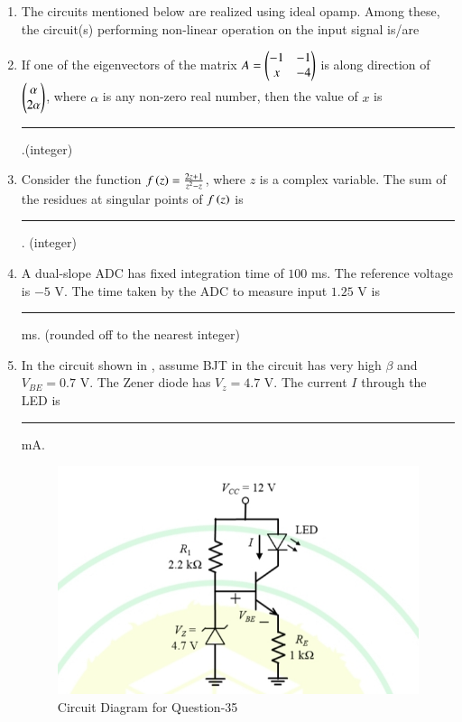 \documentclass[journal,12pt,onecolumn]{IEEEtran}
\theoremstyle{remark}
\begin{document}
\begin{enumerate}
\item The circuits mentioned below are realized using ideal opamp. Among these, the circuit(s) performing non-linear operation on the input signal is/are \par\hfill{}
\begin{enumerate}
\end{enumerate}


\item If one of the eigenvectors of the matrix 
$A=\begin{pmatrix}-1 & -1\\ x & -4\end{pmatrix}$
is along direction of $\begin{pmatrix}\alpha \\ 2\alpha\end{pmatrix}$, where $\alpha$ is any non-zero real number, then the value of $x$ is \rule{1.5cm}{0.4pt}.(integer) \par\hfill{}


\item Consider the function $f\left(z\right)=\frac{2z+1}{z^2-z}$, where $z$ is a complex variable. The sum of the residues at singular points of $f\left(z\right)$ is \rule{1.5cm}{0.4pt}. (integer) \par\hfill{}


\item A dual-slope ADC has fixed integration time of $100$ ms. The reference voltage is $-5$ V. The time taken by the ADC to measure input $1.25$ V is \rule{1.5cm}{0.4pt} ms. (rounded off to the nearest integer) \par\hfill{}
 

\item In the circuit shown in , assume BJT in the circuit has very high $\beta$ and $V_{BE}=0.7$ V. The Zener diode has $V_z=4.7$ V. The current $I$ through the LED is \rule{1.5cm}{0.4pt} mA. \par\hfill{}
\begin{figure}[H]
\centering
\includegraphics[width=0.5\columnwidth]{Figs/Q-35.jpg}
\caption{Circuit Diagram for Question-35}
\label{35}
\end{figure}



\end{enumerate}
\end{document}
